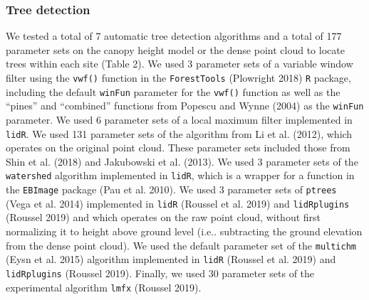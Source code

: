 \documentclass[]{article}
\begin{document}
\subsubsection{Tree detection}\label{tree-detection}

We tested a total of 7 automatic tree detection algorithms and a total
of 177 parameter sets on the canopy height model or the dense point
cloud to locate trees within each site (Table 2). We used 3 parameter
sets of a variable window filter using the \texttt{vwf()} function in
the \texttt{ForestTools} (Plowright 2018) \texttt{R} package, including
the default \texttt{winFun} parameter for the \texttt{vwf()} function as
well as the ``pines'' and ``combined'' functions from Popescu and Wynne
(2004) as the \texttt{winFun} parameter. We used 6 parameter sets of a
local maximum filter implemented in \texttt{lidR}. We used 131 parameter
sets of the algorithm from Li et al. (2012), which operates on the
original point cloud. These parameter sets included those from Shin et
al. (2018) and Jakubowski et al. (2013). We used 3 parameter sets of the
\texttt{watershed} algorithm implemented in \texttt{lidR}, which is a
wrapper for a function in the \texttt{EBImage} package (Pau et al.
2010). We used 3 parameter sets of \texttt{ptrees} (Vega et al. 2014)
implemented in \texttt{lidR} (Roussel et al. 2019) and
\texttt{lidRplugins} (Roussel 2019) and which operates on the raw point
cloud, without first normalizing it to height above ground level (i.e..
subtracting the ground elevation from the dense point cloud). We used
the default parameter set of the \texttt{multichm} (Eysn et al. 2015)
algorithm implemented in \texttt{lidR} (Roussel et al. 2019) and
\texttt{lidRplugins} (Roussel 2019). Finally, we used 30 parameter sets
of the experimental algorithm \texttt{lmfx} (Roussel 2019).
\end{document}
